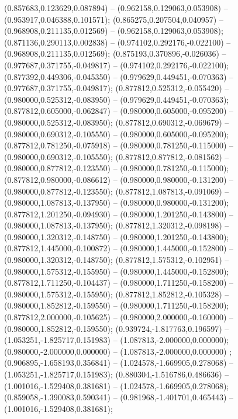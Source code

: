  (0.857683,0.123629,0.087894) -- (0.962158,0.129063,0.053908) -- (0.953917,0.046388,0.101571);
 (0.865275,0.207504,0.040957) -- (0.968908,0.211135,0.012569) -- (0.962158,0.129063,0.053908);
 (0.871136,0.290113,0.002838) -- (0.974102,0.292176,-0.022100) -- (0.968908,0.211135,0.012569);
 (0.875193,0.370896,-0.026036) -- (0.977687,0.371755,-0.049817) -- (0.974102,0.292176,-0.022100);
 (0.877392,0.449306,-0.045350) -- (0.979629,0.449451,-0.070363) -- (0.977687,0.371755,-0.049817);
 (0.877812,0.525312,-0.055420) -- (0.980000,0.525312,-0.083950) -- (0.979629,0.449451,-0.070363);
 (0.877812,0.605000,-0.062847) -- (0.980000,0.605000,-0.095200) -- (0.980000,0.525312,-0.083950);
 (0.877812,0.690312,-0.069679) -- (0.980000,0.690312,-0.105550) -- (0.980000,0.605000,-0.095200);
 (0.877812,0.781250,-0.075918) -- (0.980000,0.781250,-0.115000) -- (0.980000,0.690312,-0.105550);
 (0.877812,0.877812,-0.081562) -- (0.980000,0.877812,-0.123550) -- (0.980000,0.781250,-0.115000);
 (0.877812,0.980000,-0.086612) -- (0.980000,0.980000,-0.131200) -- (0.980000,0.877812,-0.123550);
 (0.877812,1.087813,-0.091069) -- (0.980000,1.087813,-0.137950) -- (0.980000,0.980000,-0.131200);
 (0.877812,1.201250,-0.094930) -- (0.980000,1.201250,-0.143800) -- (0.980000,1.087813,-0.137950);
 (0.877812,1.320312,-0.098198) -- (0.980000,1.320312,-0.148750) -- (0.980000,1.201250,-0.143800);
 (0.877812,1.445000,-0.100872) -- (0.980000,1.445000,-0.152800) -- (0.980000,1.320312,-0.148750);
 (0.877812,1.575312,-0.102951) -- (0.980000,1.575312,-0.155950) -- (0.980000,1.445000,-0.152800);
 (0.877812,1.711250,-0.104437) -- (0.980000,1.711250,-0.158200) -- (0.980000,1.575312,-0.155950);
 (0.877812,1.852812,-0.105328) -- (0.980000,1.852812,-0.159550) -- (0.980000,1.711250,-0.158200);
 (0.877812,2.000000,-0.105625) -- (0.980000,2.000000,-0.160000) -- (0.980000,1.852812,-0.159550);
 (0.939724,-1.817763,0.196597) -- (1.053251,-1.825717,0.151983) -- (1.087813,-2.000000,0.000000);
 (0.980000,-2.000000,0.000000) -- (1.087813,-2.000000,0.000000) ;
 (0.906895,-1.658193,0.356841) -- (1.024578,-1.669905,0.278068) -- (1.053251,-1.825717,0.151983);
 (0.880304,-1.516786,0.486636) -- (1.001016,-1.529408,0.381681) -- (1.024578,-1.669905,0.278068);
 (0.859058,-1.390083,0.590341) -- (0.981968,-1.401701,0.465443) -- (1.001016,-1.529408,0.381681);
